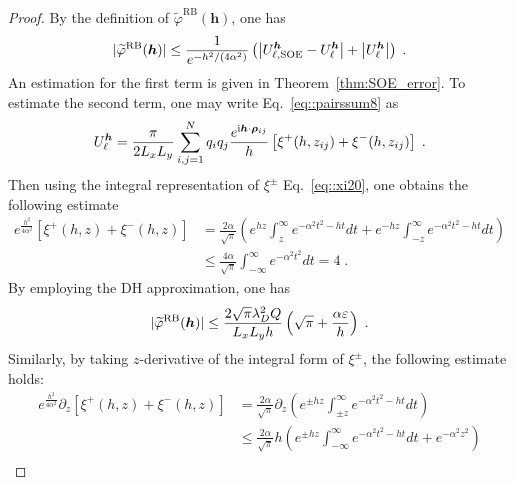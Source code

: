 \begin{proof}
	By the definition of $\widetilde{\varphi}^{\text{RB}}(\bm{h})$, one has
	\begin{equation}
		\lvert \widetilde{\varphi}^{\text{RB}}(\bm{h})\rvert\leq \frac{1}{e^{-h^2/(4\alpha^2)}}\left(\left|U_{\ell,\text{SOE}}^{\bm{h}}-U_{\ell}^{\bm{h}}\right|+\left|U_{\ell}^{\bm{h}}\right|\right)\;.
	\end{equation}
	An estimation for the first term is given in Theorem~\ref{thm:SOE_error}. 
	To estimate the second term, one may write Eq.~\eqref{eq::pairssum8} as
	\begin{equation}
		U_{\ell}^{\bm{h}} = \frac{\pi}{2 L_x L_y} \sum_{i, j = 1}^N q_i q_j \frac{e^{\mathrm{i} \boldsymbol{h} \cdot \boldsymbol{\rho}_{ij}}}{h} \left[ \xi^{+} (h, z_{ij})+\xi^{-} (h, z_{ij}) \right]\;.
	\end{equation}
	Then using the integral representation of $\xi^{\pm}$ Eq.~\eqref{eq::xi20}, one obtains the following estimate
	\begin{equation}\label{eq::118}
		\begin{split}
			e^{\frac{h^2}{4 \alpha^2}} \left[\xi^{+} (h, z)+\xi^{-} (h, z)\right] & = \frac{2\alpha}{\sqrt{\pi}} \left(e^{h z} \int_{z}^{\infty} e^{-\alpha^2 t^2 - ht} dt+e^{-h z} \int_{-z}^{\infty} e^{-\alpha^2 t^2 - ht} dt\right)\\
			& \leq \frac{4\alpha}{\sqrt{\pi}} \int_{- \infty}^{\infty} e^{-\alpha^2 t^2} dt= 4\;.
		\end{split}
	\end{equation}
	By employing the DH approximation, one has
	\begin{equation}
		\lvert \widetilde{\varphi}^{\text{RB}}(\bm{h})\rvert  \leq  \frac{2\sqrt{\pi}\lambda_D^2 Q}{L_xL_y h} \left(\sqrt{\pi} + \frac{\alpha \varepsilon}{h}\right)\;.
	\end{equation}
	Similarly, by taking $z$-derivative of the integral form of $\xi^{\pm}$, the following estimate holds:
	\begin{equation}\label{eq::estiZ}
		\begin{split}
			e^{\frac{h^2}{4 \alpha^2}} \partial_z \left[\xi^{+} (h, z)+\xi^{-} (h, z)\right] & = \frac{2\alpha}{\sqrt{\pi}} \partial_z \left( e^{\pm h z} \int_{\pm z}^{\infty} e^{-\alpha^2 t^2 - ht} dt \right) \\
			& \leq \frac{2\alpha}{\sqrt{\pi}} h \left( e^{\pm h z} \int_{- \infty}^{\infty} e^{-\alpha^2 t^2 - ht} dt + e^{-\alpha^2 z^2} \right) \\

\end{split}
\end{equation}
\end{proof}
